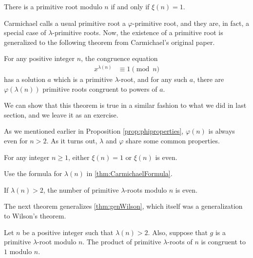 \documentclass{subfile}
\begin{document}
	\begin{proposition}
		 There is a primitive root modulo $n$ if and only if $\xi(n)=1$.
	\end{proposition}

	Carmichael calls a usual primitive root a $\varphi$-primitive root, and they are, in fact, a special case of $\lambda$-primitive roots. Now, the existence of a primitive root is generalized to the following theorem from Carmichael's original paper.
	\begin{theorem}
		For any positive integer $n$, the congruence equation
			\begin{align*}
				x^{\lambda(n)} & \equiv1\pmod n
			\end{align*}
		has a solution $a$ which is a primitive $\lambda$-root, and for any such $a$, there are $\varphi(\lambda(n))$ primitive roots congruent to powers of $a$.
	\end{theorem}
	We can show that this theorem is true in a similar fashion to what we did in last section, and we leave it as an exercise.

	As we mentioned earlier in Proposition \ref{prop:phiproperties}, $\varphi(n)$ is always even for $n>2$. As it turns out, $\lambda$ and $\varphi$ share some common properties.
	\begin{problem}
		For any integer $n\geq 1$, either $\xi(n)=1$ or $\xi(n)$ is even.
	\end{problem}

	\begin{hint}
		Use the formula for $\lambda(n)$ in \autoref{thm:CarmichaelFormula}.
	\end{hint}

	\begin{problem}
		If $\lambda(n)>2$, the number of primitive $\lambda$-roots modulo $n$ is even.
	\end{problem}

	The next theorem generalizes \autoref{thm:genWilson}, which itself was a generalization to Wilson's theorem.
	\begin{theorem}
		Let $n$ be a positive integer such that $\lambda(n)>2$. Also, suppose that $g$ is a primitive $\lambda$-root modulo $n$. The product of primitive $\lambda$-roots of $n$ is congruent to $1$ modulo $n$.
	\end{theorem}
\end{document}
